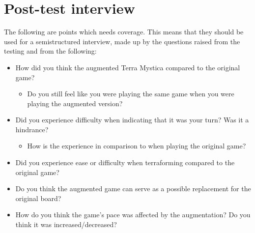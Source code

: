 \section{Post-test interview}
The following are points which needs coverage. This means that they should be used for a semistructured interview, made up by the questions raised from the testing and from the following: 
\begin{itemize}
\item How did you think the augmented Terra Mystica compared to the original game?
\begin{itemize}
\item Do you still feel like you were playing the same game when you were playing the augmented version?
\end{itemize}
\item Did you experience difficulty when indicating that it was your turn? Was it a hindrance? 
\begin{itemize}
\item How is the experience in comparison to when playing the original game?
\end{itemize}
\item Did you experience ease or difficulty when terraforming compared to the original game?
\item Do you think the augmented game can serve as a possible replacement for the original board?
\item How do you think the game's pace was affected by the augmentation? Do you think it was increased/decreased?
\end{itemize}
